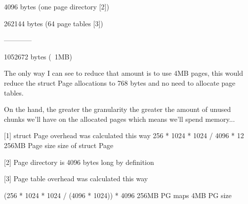   4096 bytes (one page directory [2])

  262144 bytes (64 page tables [3])

  ------------

  1052672 bytes (~1MB)

  The only way I can see to reduce that amount is to use 4MB pages, this
  would reduce the struct Page allocations to 768 bytes and no need to
  allocate page tables.

  On the hand, the greater the granularity the greater the amount of
  unused chunks we'll have on the allocated pages which means we'll
  spend memory...

  [1] struct Page overhead was calculated this way
  256 * 1024 * 1024 / 4096 * 12
  256MB Page size size of struct Page

  [2] Page directory is 4096 bytes long by definition

  [3] Page table overhead was calculated this way

  (256 * 1024 * 1024 / (4096 * 1024)) * 4096
  256MB PG maps 4MB PG size
\clearpage
